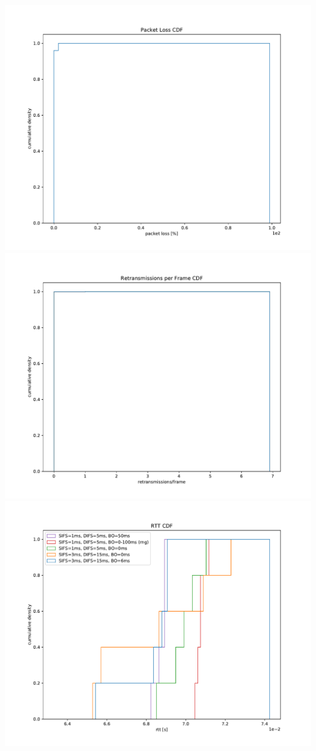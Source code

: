 \documentclass{article}
\begin{document}
	\includegraphics[width=\textwidth]{cdf/packet_loss_cdf}
	\includegraphics[width=\textwidth]{cdf/retransmissions_per_frame_cdf}
	\includegraphics[width=\textwidth]{cdf/rtt_cdf}
\end{document}
